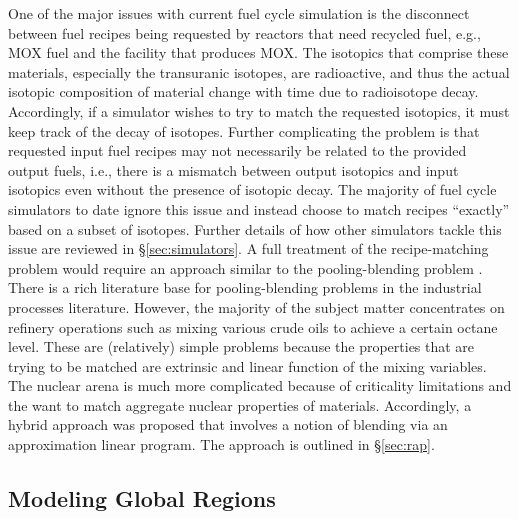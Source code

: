 One of the major issues with current fuel cycle simulation is the disconnect
between fuel recipes being requested by reactors that need recycled fuel, e.g.,
MOX fuel and the facility that produces MOX. The isotopics that comprise these
materials, especially the transuranic isotopes, are radioactive, and thus the
actual isotopic composition of material change with time due to radioisotope
decay. Accordingly, if a simulator wishes to try to match the requested
isotopics, it must keep track of the decay of isotopes. Further complicating the
problem is that requested input fuel recipes may not necessarily be related to
the provided output fuels, i.e., there is a mismatch between output isotopics
and input isotopics even without the presence of isotopic decay. The majority of
fuel cycle simulators to date ignore this issue and instead choose to match
recipes ``exactly'' based on a subset of isotopes. Further details of how other
simulators tackle this issue are reviewed in \S\ref{sec:simulators}. A full
treatment of the recipe-matching problem would require an approach similar to
the pooling-blending problem \cite{tawarmalani_convexification_2002}. There is a
rich literature base for pooling-blending problems
\cite{glen_mixed_1988,rigby_evolution_1995,mendez_simultaneous_2006,misener_advances_2009}
in the industrial processes literature. However, the majority of the subject
matter concentrates on refinery operations such as mixing various crude oils to
achieve a certain octane level. These are (relatively) simple problems because
the properties that are trying to be matched are extrinsic and linear function
of the mixing variables. The nuclear arena is much more complicated because of
criticality limitations and the want to match aggregate nuclear properties of
materials. Accordingly, a hybrid approach was proposed that involves a notion of
blending via an approximation linear program. The approach is outlined in
\S\ref{sec:rap}.

\subsection{Modeling Global Regions}

